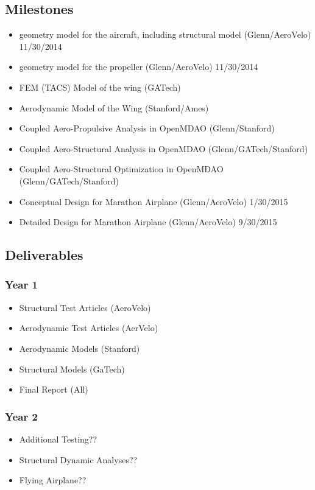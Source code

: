 \documentclass[]{aiaa-tc}
\begin{document}
    \subsection{Milestones}
        \begin{itemize}
            \item geometry model for the aircraft, including structural model (Glenn/AeroVelo) 11/30/2014
            \item geometry model for the propeller (Glenn/AeroVelo) 11/30/2014
            \item FEM (TACS) Model of the wing (GATech) 
            \item Aerodynamic Model of the Wing (Stanford/Ames)
            \item Coupled Aero-Propulsive Analysis in OpenMDAO (Glenn/Stanford)
            \item Coupled Aero-Structural Analysis in OpenMDAO (Glenn/GATech/Stanford) 
            \item Coupled Aero-Structural Optimization in OpenMDAO (Glenn/GATech/Stanford)
            \item Conceptual Design for Marathon Airplane (Glenn/AeroVelo) 1/30/2015
            \item Detailed Design for Marathon Airplane (Glenn/AeroVelo) 9/30/2015
        \end{itemize}

    \subsection{Deliverables}
        \subsubsection{Year 1}
            \begin{itemize}
                \item Structural Test Articles (AeroVelo)
                \item Aerodynamic Test Articles (AerVelo)
                \item Aerodynamic Models (Stanford)
                \item Structural Models (GaTech)
                \item Final Report (All)
            \end{itemize}
        \subsubsection{Year 2}
            \begin{itemize}
                \item Additional Testing?? 
                \item Structural Dynamic Analyses?? 
                \item Flying Airplane??
            \end{itemize}
\end{document}
